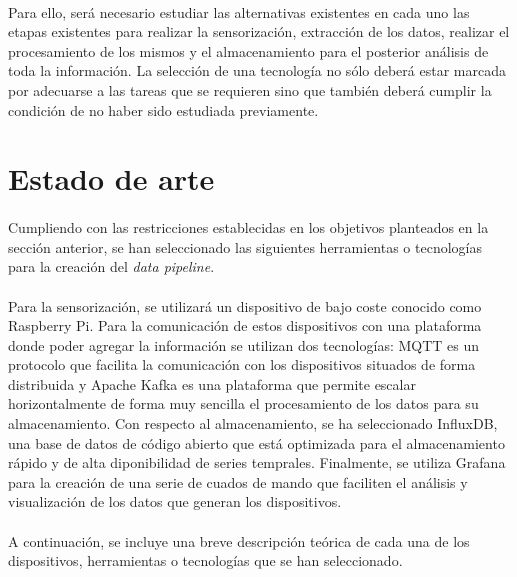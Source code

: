 \documentclass[12pt, a4paper]{article}
\begin{document}
        \paragraph{}
        Para ello, será necesario estudiar las alternativas existentes en cada uno las etapas existentes para realizar la sensorización, extracción de los datos, realizar el procesamiento de los mismos y el almacenamiento para el posterior análisis de toda la información. La selección de una tecnología no sólo deberá estar marcada por adecuarse a las tareas que se requieren sino que también deberá cumplir la condición de no haber sido estudiada previamente.

        \section{Estado de arte}

        \paragraph{}
        Cumpliendo con las restricciones establecidas en los objetivos planteados en la sección anterior, se han seleccionado las siguientes herramientas o tecnologías para la creación del \textit{data pipeline}. 
        
        \paragraph{}
        Para la sensorización, se utilizará un dispositivo de bajo coste conocido como Raspberry Pi. Para la comunicación de estos dispositivos con una plataforma donde poder agregar la información se utilizan dos tecnologías: MQTT es un protocolo que facilita la comunicación con los dispositivos situados de forma distribuida y Apache Kafka es una plataforma que permite escalar horizontalmente de forma muy sencilla el procesamiento de los datos para su almacenamiento. Con respecto al almacenamiento, se ha seleccionado InfluxDB, una base de datos de código abierto que está optimizada para el almacenamiento rápido y de alta diponibilidad de series temprales. Finalmente, se utiliza Grafana para la creación de una serie de cuados de mando que faciliten el análisis y visualización de los datos que generan los dispositivos.

        \paragraph{}
        A continuación, se incluye una breve descripción teórica de cada una de los dispositivos, herramientas o tecnologías que se han seleccionado.
\end{document}

